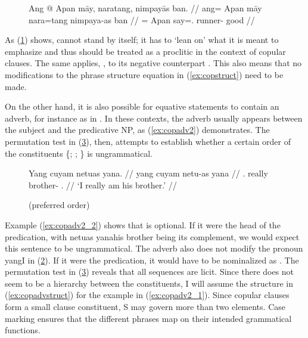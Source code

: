 \begin{figure}
\ex\label{ex:copemphclit}\ljudge*\begingl
	\gla Ang @ Apan māy, naratang, nimpayās ban. //
	\glb ang= Apan māy nara=tang nimpaya-as ban //
	\glc \Aarg{}= Apan \Int{} say=\TplM{}.\Aarg{} runner-\Parg{} good //
\endgl\xe
\end{figure}

As (\ref{ex:copemphclit}) shows,  cannot stand by itself; it
has to `lean on' what it is meant to emphasize and thus should be treated as a
proclitic in the context of copular clauses. The same applies, , to its negative counterpart . This also means that
no modifications to the phrase structure equation in (\ref{ex:copstruct}) need
to be made.

On the other hand, it is also possible for equative statements to contain an
adverb, for instance as in . In these contexts, the
adverb usually appears between the subject and the predicative NP, as
(\ref{ex:copadv2}) demonstrates. The permutation test in (\ref{ex:copadvperm}),
then, attempts to establish whether a certain order of the constituents 
\{; ; \} is ungrammatical.

\begin{figure}
\pex\label{ex:copadv2}
\a\label{ex:copadv2_1}\begingl
	\gla Yang cuyam netuas yana. //
	\glb yang cuyam netu-as yana //
	\glc \Fsg{}.\Aarg{} really brother-\Parg{} \TsgM{}.\Gen{} //
	\glft `I really am his brother.' //
\endgl

\a\label{ex:copadv2_2}%

\a\label{ex:copadv2_3}\ljudge*%

\xe
\end{figure}

\begin{figure}
\pex\label{ex:copadvperm}
\a{} (preferred order)
\a{}
\a{}
\a{}
\a{}
\a{}
\xe
\end{figure}

Example (\ref{ex:copadv2_2}) shows that  is
optional. If it were the head of the predication, with 
{netuas yana}{his brother} being its complement, we would expect this sentence
to be ungrammatical. The adverb also does not modify the pronoun 
{yang}{I} in (\ref{ex:copadv2_3}). If it were the predication, it would have to
be nominalized as . The permutation test in
(\ref{ex:copadvperm}) reveals that all sequences are licit. Since there does
not seem to be a hierarchy between the constituents, I will assume the
structure in (\ref{ex:copadvstruct}) for the example in (\ref{ex:copadv2_1}).
Since copular clauses form a small clause constituent, S may govern more than
two elements. Case marking ensures that the different phrases map on their
intended grammatical functions.

